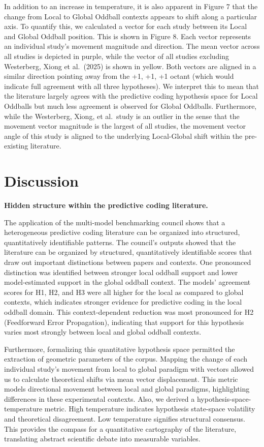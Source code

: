 \documentclass[12pt]{article}
\begin{document}
In addition to an increase in temperature, it is also apparent in Figure 7 that the change from Local to Global Oddball contexts appears to shift along a particular axis. To quantify this, we calculated a vector for each study between its Local and Global Oddball position. This is shown in Figure 8. Each vector represents an individual study's movement magnitude and direction. The mean vector across all studies is depicted in purple, while the vector of all studies excluding Westerberg, Xiong et al.~(2025) is shown in yellow. Both vectors are aligned in a similar direction pointing away from the +1, +1, +1 octant (which would indicate full agreement with all three hypotheses). We interpret this to mean that the literature largely agrees with the predictive coding hypothesis space for Local Oddballs but much less agreement is observed for Global Oddballs. Furthermore, while the Westerberg, Xiong, et al.~study is an outlier in the sense that the movement vector magnitude is the largest of all studies, the movement vector angle of this study is aligned to the underlying Local-Global shift within the pre-existing literature.


\section{Discussion}\label{discussion}

\noindent\textbf{Hidden structure within the predictive coding literature.}

The application of the multi-model benchmarking council shows that a heterogeneous predictive coding literature can be organized into structured, quantitatively identifiable patterns. The council's outputs showed that the literature can be organized by structured, quantitatively identifiable scores that draw out important distinctions between papers and contexts. One pronounced distinction was identified between stronger local oddball support and lower model-estimated support in the global oddball context. The models' agreement scores for H1, H2, and H3 were all higher for the local as compared to global contexts, which indicates stronger evidence for predictive coding in the local oddball domain. This context-dependent reduction was most pronounced for H2 (Feedforward Error Propagation), indicating that support for this hypothesis varies most strongly between local and global oddball contexts.

Furthermore, formalizing this quantitative hypothesis space permitted the extraction of geometric parameters of the corpus. Mapping the change of each individual study's movement from local to global paradigm with vectors allowed us to calculate theoretical shifts via mean vector displacement. This metric models directional movement between local and global paradigms, highlighting differences in these experimental contexts. Also, we derived a hypothesis-space-temperature metric. High temperature indicates hypothesis state-space volatility and theoretical disagreement. Low temperature signifies structural consensus. This provides the compass for a quantitative cartography of the literature, translating abstract scientific debate into measurable variables.
\end{document}
